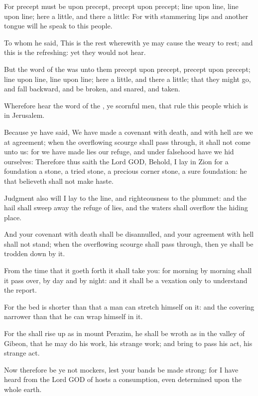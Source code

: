 \Verse For precept must be upon precept, precept upon precept; line upon line, line upon line; here a little, and there a little: \Verse For with stammering lips and another tongue will he speak to this people.

\Verse To whom he said, This is the rest wherewith ye may cause the weary to rest; and this is the refreshing: yet they would not hear.

\Verse But the word of the \LORD was unto them precept upon precept, precept upon precept; line upon line, line upon line; here a little, and there a little; that they might go, and fall backward, and be broken, and snared, and taken.

\Verse Wherefore hear the word of the \LORD, ye scornful men, that rule this people which is in Jerusalem.

\Verse Because ye have said, We have made a covenant with death, and with hell are we at agreement; when the overflowing scourge shall pass through, it shall not come unto us: for we have made lies our refuge, and under falsehood have we hid ourselves: \Verse Therefore thus saith the Lord GOD, Behold, I lay in Zion for a foundation a stone, a tried stone, a precious corner stone, a sure foundation: he that believeth shall not make haste.

\Verse Judgment also will I lay to the line, and righteousness to the plummet: and the hail shall sweep away the refuge of lies, and the waters shall overflow the hiding place.

\Verse And your covenant with death shall be disannulled, and your agreement with hell shall not stand; when the overflowing scourge shall pass through, then ye shall be trodden down by it.

\Verse From the time that it goeth forth it shall take you: for morning by morning shall it pass over, by day and by night: and it shall be a vexation only to understand the report.

\Verse For the bed is shorter than that a man can stretch himself on it: and the covering narrower than that he can wrap himself in it.

\Verse For the \LORD shall rise up as in mount Perazim, he shall be wroth as in the valley of Gibeon, that he may do his work, his strange work; and bring to pass his act, his strange act.

\Verse Now therefore be ye not mockers, lest your bands be made strong: for I have heard from the Lord GOD of hosts a consumption, even determined upon the whole earth.

